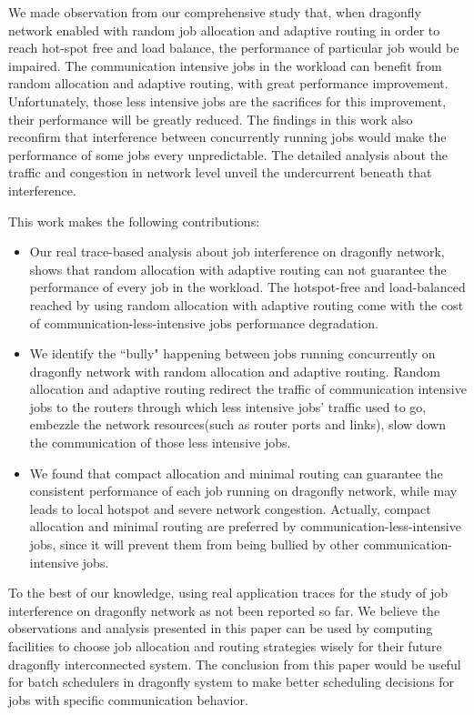 \documentclass[conference,compsoc]{IEEEtran}
\begin{document}
We made observation from our comprehensive study that, when dragonfly network enabled with random job allocation and adaptive routing in order to reach hot-spot free and load balance, the performance of particular job would be impaired. The communication intensive jobs in the workload can benefit from random allocation and adaptive routing, with great performance improvement. Unfortunately, those less intensive jobs are the sacrifices for this improvement, their performance will be greatly reduced. The findings in this work also reconfirm that interference between concurrently running jobs would make the performance of some jobs every unpredictable. The detailed analysis about the traffic and congestion in network level unveil the undercurrent beneath that interference.  

This work makes the following contributions:

\begin{itemize}
   
    \item Our real trace-based analysis about job interference on dragonfly network, shows that random allocation with adaptive routing can not guarantee the performance of every job in the workload. The hotspot-free and load-balanced reached by using random allocation with adaptive routing come with the cost of communication-less-intensive jobs performance degradation. 

    \item We identify the ``bully" happening between jobs running concurrently on dragonfly network with random allocation and adaptive routing. Random allocation and adaptive routing redirect the traffic of communication intensive jobs to the routers through which less intensive jobs' traffic used to go, embezzle the network resources(such as router ports and links), slow down the communication of those less intensive jobs.

    
    \item We found that compact allocation and minimal routing can guarantee the consistent performance of each job running on dragonfly network, while may leads to local hotspot and severe network congestion. Actually, compact allocation and minimal routing are preferred by communication-less-intensive jobs, since it will prevent them from being bullied by other communication-intensive jobs.
    
         
\end{itemize}

To the best of our knowledge, using real application traces for the study of job interference on dragonfly network as not been reported so far. We believe the observations and analysis presented in this paper can be used by computing facilities to choose  job allocation and routing strategies wisely for their future dragonfly interconnected system. The conclusion from this paper would be useful for batch schedulers in dragonfly system to make better scheduling decisions for jobs with specific communication behavior.
\end{document}
